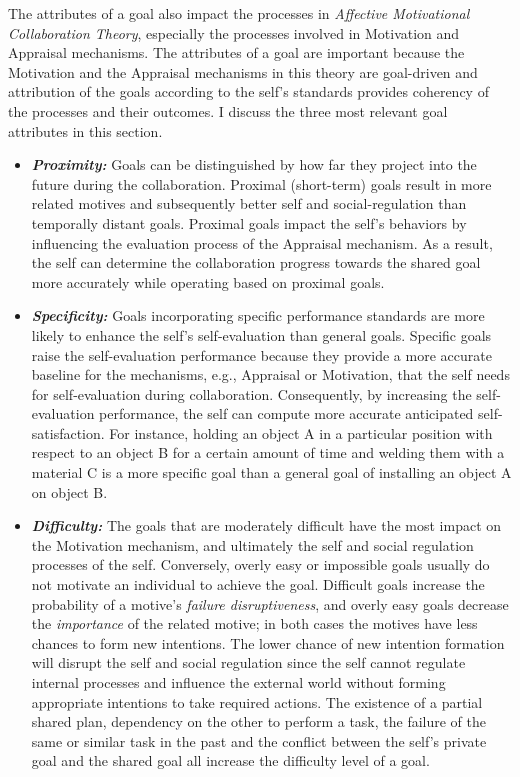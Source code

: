 \documentclass[letterpaper]{article}
\begin{document}
The attributes of a goal also impact the processes in \textit{Affective
Motivational Collaboration Theory}, especially the processes involved in
Motivation and Appraisal mechanisms. The attributes of a goal are important
because the Motivation and the Appraisal mechanisms in this theory are
goal-driven and attribution of the goals according to the self's standards
provides coherency of the processes and their outcomes. I discuss the three most
relevant goal attributes in this section.

\begin{itemize}
  \item \textbf{\textit{Proximity:}} Goals can be distinguished by how far they
  project into the future during the collaboration. Proximal (short-term) goals
  result in more related motives and subsequently better self and
  social-regulation than temporally distant goals. Proximal goals impact the
  self's behaviors by influencing the evaluation process of the Appraisal
  mechanism. As a result, the self can determine the collaboration progress
  towards the shared goal more accurately while operating based on proximal
  goals.
  
  \item \textbf{\textit{Specificity:}} Goals incorporating specific performance
  standards are more likely to enhance the self's self-evaluation than general
  goals. Specific goals raise the self-evaluation performance because they
  provide a more accurate baseline for the mechanisms, e.g., Appraisal or
  Motivation, that the self needs for self-evaluation during collaboration.
  Consequently, by increasing the self-evaluation performance, the self can
  compute more accurate anticipated self-satisfaction. For instance, holding an
  object A in a particular position with respect to an object B for a certain
  amount of time and welding them with a material C is a more specific goal than
  a general goal of installing an object A on object B.
  
  \item \textbf{\textit{Difficulty:}} The goals that are moderately difficult
  have the most impact on the Motivation mechanism, and ultimately the self and
  social regulation processes of the self. Conversely, overly easy or impossible
  goals usually do not motivate an individual to achieve the goal. Difficult
  goals increase the probability of a motive's \textit{failure disruptiveness},
  and overly easy goals decrease the \textit{importance} of the related motive;
  in both cases the motives have less chances to form new intentions. The lower
  chance of new intention formation will disrupt the self and social regulation
  since the self cannot regulate internal processes and influence the external
  world without forming appropriate intentions to take required actions. The
  existence of a partial shared plan, dependency on the other to perform a task,
  the failure of the same or similar task in the past and the conflict between
  the self's private goal and the shared goal all increase the difficulty level
  of a goal.
\end{itemize}
\end{document}
